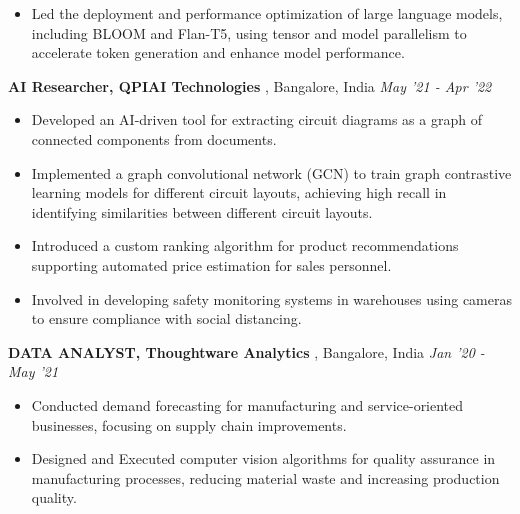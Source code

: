 \documentclass[10pt,a4]{article}
\begin{document}
{\begin{flushleft}
\begin{itemize}
         \item Led the deployment and performance optimization of large language models, including BLOOM and Flan-T5, using tensor and model parallelism to accelerate token generation and enhance model performance.
    \end{itemize}	

    \textbf{\large AI Researcher, QPIAI Technologies },  Bangalore, India \hfill \textit{\large May '21 - Apr '22}	\\
    \begin{itemize}
          
        \item Developed an AI-driven tool for extracting circuit diagrams as a graph of connected components from documents.
        \item Implemented a graph convolutional network (GCN) to train graph contrastive learning models for different circuit layouts, achieving high recall in identifying similarities between different circuit layouts.
        \item Introduced a custom ranking algorithm for product recommendations supporting automated price estimation for sales personnel.
        \item Involved in developing safety monitoring systems in warehouses using cameras to ensure compliance with social distancing.
    \end{itemize}		

    \textbf{\large DATA ANALYST, Thoughtware Analytics },  Bangalore, India \hfill \textit{\large Jan '20 - May '21}	\\		
    \begin{itemize}
          
        \item Conducted demand forecasting for manufacturing and service-oriented businesses, focusing on supply chain improvements.
        \item Designed and Executed computer vision algorithms for quality assurance in manufacturing processes, reducing material waste and increasing production quality.   
    \end{itemize}
    

\end{flushleft}}
\end{document}
